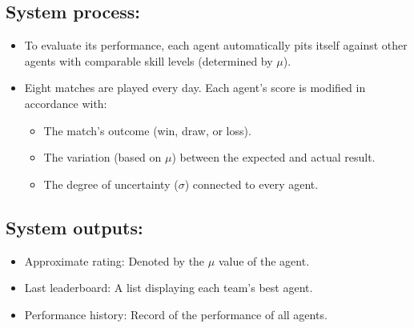 \subsection*{System process:}
\begin{itemize}
    \item To evaluate its performance, each agent automatically pits itself against other agents with comparable skill levels (determined by $\mu$).
    \item Eight matches are played every day. Each agent's score is modified in accordance with:
    \begin{itemize}
        \item The match's outcome (win, draw, or loss).
        \item The variation (based on $\mu$) between the expected and actual result.
        \item The degree of uncertainty ($\sigma$) connected to every agent.
    \end{itemize}
\end{itemize}

\subsection*{System outputs:}
\begin{itemize}
    \item Approximate rating: Denoted by the $\mu$ value of the agent.
    \item Last leaderboard: A list displaying each team's best agent.
    \item Performance history: Record of the performance of all agents.
\end{itemize}
